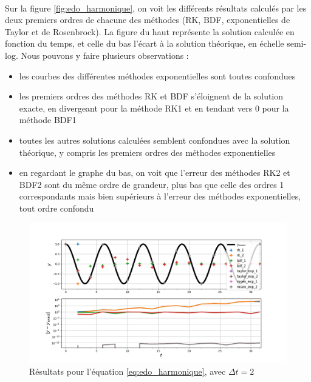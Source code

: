     \paragraph{}
    Sur la figure \ref{fig:edo_harmonique}, on voit les différents résultats calculés par les deux premiers ordres de chacune des méthodes (RK, BDF, exponentielles de Taylor et de Rosenbrock). La figure du haut représente la solution calculée en fonction du temps, et celle du bas l'écart à la solution théorique, en échelle semi-log. Nous pouvons y faire plusieurs observations :
    \begin{itemize}
        \item les courbes des différentes méthodes exponentielles sont toutes confondues
        \item les premiers ordres des méthodes RK et BDF s'éloignent de la solution exacte, en divergeant pour la méthode RK1 et en tendant vers 0 pour la méthode BDF1
        \item toutes les autres solutions calculées semblent confondues avec la solution théorique, y compris les premiers ordres des méthodes exponentielles
        \item en regardant le graphe du bas, on voit que l'erreur des méthodes RK2 et BDF2 sont du même ordre de grandeur, plus bas que celle des ordres 1 correspondants mais bien supérieurs à l'erreur des méthodes exponentielles, tout ordre confondu
    \end{itemize}
    \begin{figure}
        \centering
        \includegraphics[width=\textwidth]{images/results/edo_sine_large_dt.png}
        \caption{Résultats pour l'équation \ref{eq:edo_harmonique}, avec $\Delta t = 2$}
        \label{fig:edo_harmonique_2}
    \end{figure}
